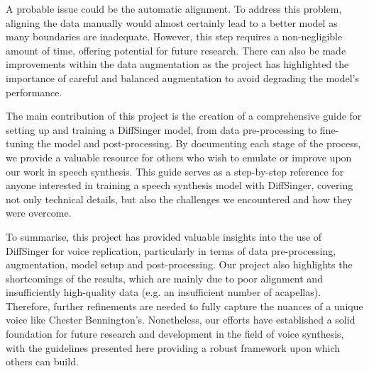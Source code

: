 \documentclass[a4paper]{article}
\begin{document}
	A probable issue could be the automatic alignment. To address this problem, aligning the data manually would almost certainly lead to a better model as many boundaries are inadequate. However, this step requires a non-negligible amount of time, offering potential for future research. There can also be made improvements within the data augmentation as the project has highlighted the importance of careful and balanced augmentation to avoid degrading the model’s performance.
	
	The main contribution of this project is the creation of a comprehensive guide for setting up and training a DiffSinger model, from data pre-processing to fine-tuning the model and post-processing. By documenting each stage of the process, we provide a valuable resource for others who wish to emulate or improve upon our work in speech synthesis. This guide serves as a step-by-step reference for anyone interested in training a speech synthesis model with DiffSinger, covering not only technical details, but also the challenges we encountered and how they were overcome.
	
	
	To summarise, this project has provided valuable insights into the use of DiffSinger for voice replication, particularly in terms of data pre-processing, augmentation, model setup and post-processing. Our project also highlights the shortcomings of the results, which are mainly due to poor alignment and insufficiently high-quality data (e.g. an insufficient number of acapellas).  Therefore, further refinements are needed to fully capture the nuances of a unique voice like Chester Bennington's. Nonetheless, our efforts have established a solid foundation for future research and development in the field of voice synthesis, with the guidelines presented here providing a robust framework upon which others can build.
	
	
	
	
	
\end{document}
